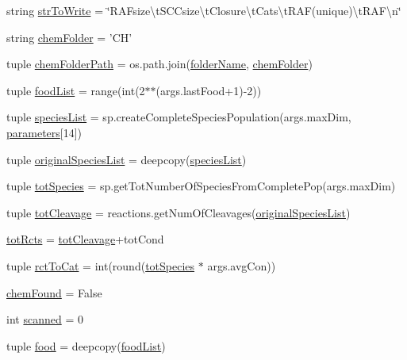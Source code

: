 \begin{DoxyCompactItemize}
\item 
string \hyperlink{a00137_a2425798997b1c46c8bbed77ecffcaa9f}{str\+To\+Write} = \char`\"{}R\+A\+Fsize\textbackslash{}t\+S\+C\+Csize\textbackslash{}t\+Closure\textbackslash{}t\+Cats\textbackslash{}t\+R\+A\+F(unique)\textbackslash{}t\+R\+A\+F\textbackslash{}n\char`\"{}
\item 
string \hyperlink{a00137_a4a57e1e8a830824b985f34ee1af52b93}{chem\+Folder} = 'C\+H'
\item 
tuple \hyperlink{a00137_a633d7089af5a033807ccba3b7e9ad483}{chem\+Folder\+Path} = os.\+path.\+join(\hyperlink{a00137_aa51c106700ef9afbdb94a1c800e10569}{folder\+Name}, \hyperlink{a00137_a4a57e1e8a830824b985f34ee1af52b93}{chem\+Folder})
\item 
tuple \hyperlink{a00137_a402edf66e27aa29932e16311c9756b02}{food\+List} = range(int(2$\ast$$\ast$(args.\+last\+Food+1)-\/2))
\item 
tuple \hyperlink{a00137_a79af2b1d3fe38f2cd259cc56b1ecc5f3}{species\+List} = sp.\+create\+Complete\+Species\+Population(args.\+max\+Dim, \hyperlink{a00137_a646de756d594b9a0eebf18c4eb9ee0d6}{parameters}\mbox{[}14\mbox{]})
\item 
tuple \hyperlink{a00137_ab4024b0cf8a4136e81ae636c9cf6e0e4}{original\+Species\+List} = deepcopy(\hyperlink{a00137_a79af2b1d3fe38f2cd259cc56b1ecc5f3}{species\+List})
\item 
tuple \hyperlink{a00137_a7f8e1635318ca1aac728dd7165aa49b5}{tot\+Species} = sp.\+get\+Tot\+Number\+Of\+Species\+From\+Complete\+Pop(args.\+max\+Dim)
\item 
tuple \hyperlink{a00137_a517da3913f56e5216fa2c68818e04ecc}{tot\+Cleavage} = reactions.\+get\+Num\+Of\+Cleavages(\hyperlink{a00137_ab4024b0cf8a4136e81ae636c9cf6e0e4}{original\+Species\+List})
\item 
\hyperlink{a00137_a1c0855f92c2dd2dd4a30f6624f6e1af0}{tot\+Rcts} = \hyperlink{a00137_a517da3913f56e5216fa2c68818e04ecc}{tot\+Cleavage}+tot\+Cond
\item 
tuple \hyperlink{a00137_afee9c574290c862d3ad8a51a77b2a72e}{rct\+To\+Cat} = int(round(\hyperlink{a00137_a7f8e1635318ca1aac728dd7165aa49b5}{tot\+Species} $\ast$ args.\+avg\+Con))
\item 
\hyperlink{a00137_acdd521d6bd1a71be37421dafd210de99}{chem\+Found} = False
\item 
int \hyperlink{a00137_afafc4f533cad86cb7fd1b6fe5ed9effa}{scanned} = 0
\item 
tuple \hyperlink{a00137_a4fe31b6cfa3dcaa4141be9282566fa7a}{food} = deepcopy(\hyperlink{a00137_a402edf66e27aa29932e16311c9756b02}{food\+List})
$$
\end{DoxyCompactItemize}
